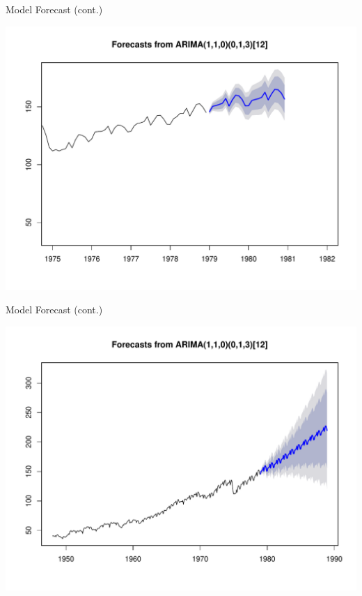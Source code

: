 \documentclass[11pt,ignorenonframetext,]{beamer}
\begin{document}
\begin{frame}{Model Forecast (cont.)}

\includegraphics{Lec11_files/figure-beamer/unnamed-chunk-27-1.pdf}

\end{frame}

\begin{frame}{Model Forecast (cont.)}

\includegraphics{Lec11_files/figure-beamer/unnamed-chunk-28-1.pdf}

\end{frame}
\end{document}

